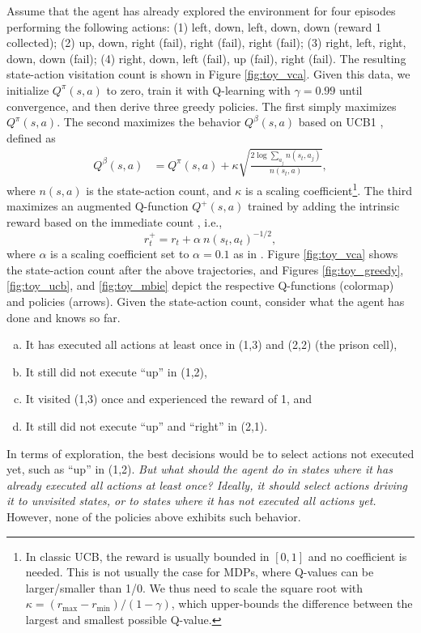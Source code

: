 \documentclass{article}
\newcommand{\coeff}{\kappa}
\begin{document}
Assume that the agent has already explored the environment for four episodes performing the following actions: (1) left, down, left, down, down (reward 1 collected); (2) up, down, right (fail), right (fail), right (fail); (3) right, left, right, down, down (fail); (4) right, down, left (fail), up (fail), right (fail). The resulting state-action visitation count is shown in Figure \ref{fig:toy_vca}. Given this data, we initialize $Q^\pi(s,a)$ to zero, train it with Q-learning with $\gamma = 0.99$ until convergence, and then derive three greedy policies. The first simply maximizes $Q^\pi(s,a)$. The second maximizes the behavior $Q^\beta(s,a)$ based on UCB1 \citep{auer2002finite}, defined as
\begin{align}
Q^\beta(s,a) &= Q^\pi(s,a) + \coeff \sqrt{\frac{2\log \sum_{a_j} n(s_t,a_j)}{n(s_t,a)}},\label{eq:ucb1}
\end{align}
where $n(s,a)$ is the state-action count, and $\coeff$ is a scaling coefficient\footnote{In classic UCB, the reward is usually bounded in $[0,1]$ and no coefficient is needed. This is not usually the case for MDPs, where Q-values can be larger/smaller than 1/0. We thus need to scale the square root with $\coeff = (r_{\max} - r_{\min}) / (1 - \gamma)$, which upper-bounds the difference between the largest and smallest possible Q-value.}.
The third maximizes an augmented Q-function $Q^+(s,a)$ trained by adding the intrinsic reward based on the immediate count \citep{strehl2008analysis}, i.e.,
\begin{equation}
r^+_t = r_t + {\alpha}\:{{n(s_t,a_t)}^{-1/2}},\label{eq:exp_bonus}
\end{equation} 
where $\alpha$ is a scaling coefficient set to $\alpha = 0.1$ as in \citep{strehl2008analysis,bellemare2016unifying}.
Figure \ref{fig:toy_vca} shows the state-action count after the above trajectories, and Figures \ref{fig:toy_greedy}, \ref{fig:toy_ucb}, and \ref{fig:toy_mbie} depict the respective Q-functions (colormap) and policies (arrows). Given the state-action count, consider what the agent has done and knows so far.
\begin{enumerate}[a)]
\setlength{\itemsep}{0pt}
\item It has executed all actions at least once in (1,3) and (2,2) (the prison cell),
\item It still did not execute ``up'' in (1,2),
\item It visited (1,3) once and experienced the reward of 1, and
\item It still did not execute ``up'' and ``right'' in (2,1).
\end{enumerate}
In terms of exploration, the best decisions would be to select actions not executed yet, such as ``up'' in (1,2). \textit{But what should the agent do in states where it has already executed all actions at least once? Ideally, it should select actions driving it to unvisited states, or to states where it has not executed all actions yet.}
However, none of the policies above exhibits such behavior. 
\end{document}
